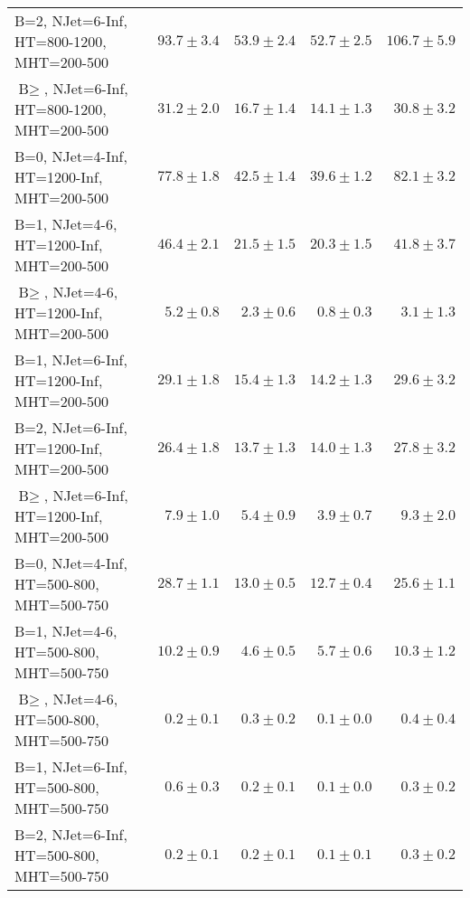 \begin{table}
\begin{tabular}{l|r|r|r|r}
    B=2, NJet=6-Inf, HT=800-1200, MHT=200-500 &              $93.7\pm3.4$&              $53.9\pm2.4$&              $52.7\pm2.5$&                 $106.7\pm5.9$ \\ 
    $\text{B}\geq$, NJet=6-Inf, HT=800-1200, MHT=200-500 &              $31.2\pm2.0$&              $16.7\pm1.4$&              $14.1\pm1.3$&                  $30.8\pm3.2$ \\ 
    B=0, NJet=4-Inf, HT=1200-Inf, MHT=200-500 &              $77.8\pm1.8$&              $42.5\pm1.4$&              $39.6\pm1.2$&                  $82.1\pm3.2$ \\ 
    B=1, NJet=4-6, HT=1200-Inf, MHT=200-500 &              $46.4\pm2.1$&              $21.5\pm1.5$&              $20.3\pm1.5$&                  $41.8\pm3.7$ \\ 
    $\text{B}\geq$, NJet=4-6, HT=1200-Inf, MHT=200-500 &               $5.2\pm0.8$&               $2.3\pm0.6$&               $0.8\pm0.3$&                   $3.1\pm1.3$ \\ 
    B=1, NJet=6-Inf, HT=1200-Inf, MHT=200-500 &              $29.1\pm1.8$&              $15.4\pm1.3$&              $14.2\pm1.3$&                  $29.6\pm3.2$ \\ 
    B=2, NJet=6-Inf, HT=1200-Inf, MHT=200-500 &              $26.4\pm1.8$&              $13.7\pm1.3$&              $14.0\pm1.3$&                  $27.8\pm3.2$ \\ 
    $\text{B}\geq$, NJet=6-Inf, HT=1200-Inf, MHT=200-500 &               $7.9\pm1.0$&               $5.4\pm0.9$&               $3.9\pm0.7$&                   $9.3\pm2.0$ \\ 
    B=0, NJet=4-Inf, HT=500-800, MHT=500-750 &              $28.7\pm1.1$&              $13.0\pm0.5$&              $12.7\pm0.4$&                  $25.6\pm1.1$ \\ 
    B=1, NJet=4-6, HT=500-800, MHT=500-750 &              $10.2\pm0.9$&               $4.6\pm0.5$&               $5.7\pm0.6$&                  $10.3\pm1.2$ \\ 
    $\text{B}\geq$, NJet=4-6, HT=500-800, MHT=500-750 &               $0.2\pm0.1$&               $0.3\pm0.2$&               $0.1\pm0.0$&                   $0.4\pm0.4$ \\ 
    B=1, NJet=6-Inf, HT=500-800, MHT=500-750 &               $0.6\pm0.3$&               $0.2\pm0.1$&               $0.1\pm0.0$&                   $0.3\pm0.2$ \\ 
    B=2, NJet=6-Inf, HT=500-800, MHT=500-750 &               $0.2\pm0.1$&               $0.2\pm0.1$&               $0.1\pm0.1$&                   $0.3\pm0.2$ \\ 

\end{tabular}
\end{table}
